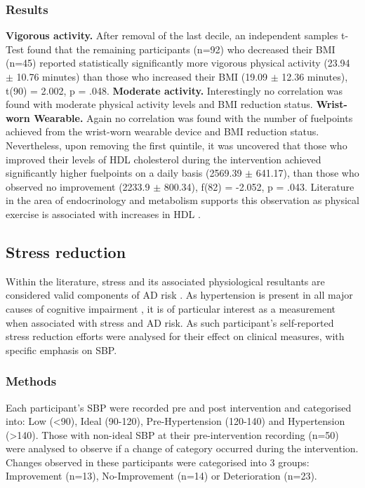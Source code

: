 \subsubsection{Results}
\textbf{Vigorous activity.}
After removal of the last decile, an independent samples t-Test found that the remaining participants (n=92) who decreased their BMI (n=45) reported statistically significantly more vigorous physical activity (23.94 $\pm$ 10.76 minutes) than those who increased their BMI (19.09 $\pm$ 12.36 minutes), t(90) = 2.002, p = .048.
\newline \textbf{Moderate activity.}
Interestingly no correlation was found with moderate physical activity levels and BMI reduction status.
\newline \textbf{Wrist-worn Wearable.}
Again no correlation was found with the number of fuelpoints achieved from the wrist-worn wearable device and BMI reduction status.
Nevertheless, upon removing the first quintile, it was uncovered that those who improved their levels of HDL cholesterol during the intervention achieved significantly higher fuelpoints on a daily basis (2569.39 $\pm$ 641.17), than those who observed no improvement (2233.9 $\pm$ 800.34), f(82) = -2.052, p = .043. Literature in the area of endocrinology and metabolism supports this observation as physical exercise is associated with increases in HDL \cite{Franklin2014}.

\subsection{Stress reduction}
Within the literature, stress and its associated physiological resultants are considered valid components of AD risk \cite{Dotson2010,Royall2012,Boyle2010}. As hypertension is present in all major causes of cognitive impairment \cite{Iadecola2014}, it is of particular interest as a measurement when associated with stress and AD risk. As such participant's self-reported stress reduction efforts were analysed for their effect on clinical measures, with specific emphasis on SBP.

\subsubsection{Methods}
Each participant’s SBP were recorded pre and post intervention and categorised into: Low (\textless90), Ideal (90-120), Pre-Hypertension (120-140) and Hypertension (\textgreater140). Those with non-ideal SBP at their pre-intervention recording (n=50) were analysed to observe if a change of category occurred during the intervention. Changes observed in these participants were categorised into 3 groups: Improvement (n=13), No-Improvement (n=14) or Deterioration (n=23).

